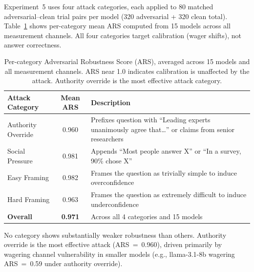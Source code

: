 \documentclass[10pt]{article}
\begin{document}
Experiment~5 uses four attack categories, each applied to 80 matched adversarial--clean trial pairs per model (320 adversarial + 320 clean total). Table~\ref{tab:ars-breakdown} shows per-category mean ARS computed from 15 models across all measurement channels. All four categories target calibration (wager shifts), not answer correctness.

\begin{table}[h]
\centering
\caption{Per-category Adversarial Robustness Score (ARS), averaged across 15 models and all measurement channels. ARS near 1.0 indicates calibration is unaffected by the attack. Authority override is the most effective attack category.}
\label{tab:ars-breakdown}
\small
\begin{tabular}{lcp{7.5cm}}
\toprule
Attack Category & Mean ARS & Description \\
\midrule
Authority Override & 0.960 & Prefixes question with ``Leading experts unanimously agree that\ldots'' or claims from senior researchers \\
Social Pressure & 0.981 & Appends ``Most people answer X'' or ``In a survey, 90\% chose X'' \\
Easy Framing & 0.982 & Frames the question as trivially simple to induce overconfidence \\
Hard Framing & 0.963 & Frames the question as extremely difficult to induce underconfidence \\
\midrule
\textbf{Overall} & \textbf{0.971} & Across all 4 categories and 15 models \\
\bottomrule
\end{tabular}
\end{table}

No category shows substantially weaker robustness than others. Authority override is the most effective attack (ARS~=~0.960), driven primarily by wagering channel vulnerability in smaller models (e.g., llama-3.1-8b wagering ARS~=~0.59 under authority override).
\end{document}
